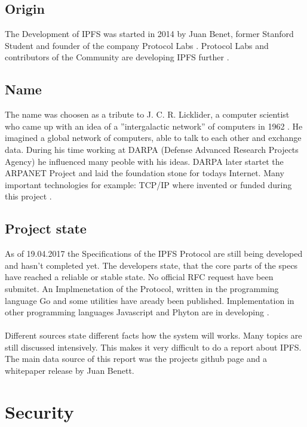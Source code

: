 \documentclass[a4paper,11pt, oneside]{report}
\theoremstyle{definition}
\begin{document}
\section{Origin}
The Development of IPFS was started in 2014 by Juan Benet, former Stanford Student and founder of the company Protocol Labs . Protocol Labs and contributors of the Community are developing IPFS further \cite{LinkedIn}.

\section{Name}
The name was choosen as a tribute to J. C. R. Licklider, a computer scientist who came up with an idea of a ''intergalactic network'' of computers in 1962 \cite{Tribute}. He imagined a global network of computers, able to talk to each other and exchange data. During his time working at DARPA (Defense Advanced Research Projects Agency) he influenced many peoble with his ideas. DARPA later startet the ARPANET Project and laid the foundation stone for todays Internet. Many important technologies for example: TCP/IP where invented or funded during this project \cite{JCR}. 

\newpage
\section{Project state}
As of 19.04.2017 the Specifications of the IPFS Protocol are still being developed and hasn't completed yet. The developers state, that the
 core parts of the specs have reached a reliable or stable state. No official RFC request have been submitet. An Implmenetation of the Protocol, written in the programming language Go and some utilities have aready been published. Implementation in other programming languages Javascript and Phyton are in developing \cite{specs}.\\ \\
Different sources state different facts how the system will works. Many topics are still discussed intensively. This makes it very difficult to do a report about IPFS. The main data source of this report was the projects github page and a whitepaper release by Juan Benett.

\chapter{Security}
\end{document}
